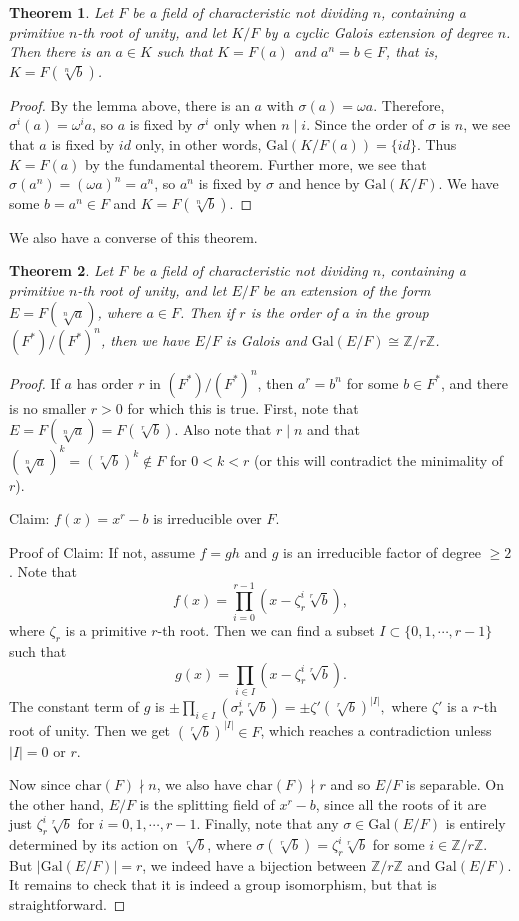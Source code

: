 \documentclass[12pt]{report}
\newtheorem{thm}{Theorem}[section]
\theoremstyle{definition}
\def\ZZ{\mathbb{Z}}
\def\Gal{\text{Gal}}
\def\char{\text{char}}
\begin{document}
\begin{thm}\label{cyclicgal1}
    Let $F$ be a field  of characteristic not dividing $n$, containing a primitive $n$-th root of unity, and let $K/F$ by a cyclic Galois extension of degree $n$. Then there is an $a\in K$ such that $K=F(a)$ and $a^n=b\in F$, that is, $K=F(\sqrt[n]{b})$.
\end{thm}

\begin{proof}
    By the lemma above, there is an $a$ with $\sigma(a)=\omega a$. Therefore, $\sigma^i(a)=\omega^ia$, so $a$ is fixed by $\sigma^i$ only when $n\mid i$. Since the order of $\sigma$ is $n$, we see that $a$ is fixed by $id$ only, in other words, $\Gal(K/F(a))=\{id\}$. Thus $K=F(a)$ by the fundamental theorem. Further more, we see that $\sigma(a^n)=(\omega a)^n=a^n$, so $a^n$ is fixed by $\sigma$ and hence by $\Gal(K/F)$. We have some $b=a^n\in F$ and $K=F(\sqrt[n]{b})$.
\end{proof}

We also have a converse of this theorem.

\begin{thm}
    Let $F$ be a field of characteristic not dividing $n$, containing a primitive $n$-th root of unity, and let $E/F$ be an extension of the form $E=F(\sqrt[n]{a})$, where $a\in F$. Then if $r$ is the order of $a$ in the group $(F^*)/(F^*)^n$, then we have $E/F$ is Galois and $\Gal(E/F)\cong \ZZ/r\ZZ$. 
\end{thm}

\begin{proof}
    If $a$ has order $r$ in $(F^*)/(F^*)^n$, then $a^r=b^n$ for some $b\in F^*$, and there is no smaller $r>0$ for which this is true. First, note that $E=F(\sqrt[n]{a})=F(\sqrt[r]{b})$. Also note that $r\mid n$ and that $(\sqrt[n]{a})^k=(\sqrt[r]{b})^k\notin F$ for $0<k<r$ (or this will contradict the minimality of $r$). 
    
    Claim: $f(x)=x^r-b$ is irreducible over $F$.

    Proof of Claim: If not, assume $f=gh$ and $g$ is an irreducible factor of degree $\geq 2$.  Note that $$f(x)=\prod_{i=0}^{r-1}(x-\zeta_r^i \sqrt[r]{b}),$$ where $\zeta_r$ is a primitive $r$-th root. Then we can find a subset $I\subset \{0,1,\cdots,r-1\}$ such that $$g(x)=\prod_{i\in I}(x-\zeta_r^i\sqrt[r]{b}).$$ The constant term of $g$ is $\pm\prod_{i\in I}(\sigma_r^i \sqrt[r]{b})=\pm \zeta' (\sqrt[r]{b})^{|I|},$ where $\zeta'$ is a $r$-th root of unity. Then we get $(\sqrt[r]{b})^{|I|}\in F$, which reaches a contradiction unless $|I|=0$ or $r$.
    
    Now since $\char(F)\nmid n$, we also have $\char(F)\nmid r$ and so $E/F$ is separable. On the other hand, $E/F$ is the splitting field of $x^r-b$, since all the roots of it are just $\zeta_r^i \sqrt[r]{b}$ for $i=0,1,\cdots,r-1$. Finally, note that any $\sigma\in \Gal(E/F)$ is entirely determined by its action on $\sqrt[r]{b}$, where $\sigma(\sqrt[r]{b})=\zeta_r^i \sqrt[r]{b}$ for some $i\in \ZZ/r\ZZ$. But $|\Gal(E/F)|=r$, we indeed have a bijection between $\ZZ/r\ZZ$  and $\Gal(E/F)$. It remains to check that it is indeed a group isomorphism, but that is straightforward.
\end{proof}
\end{document}

